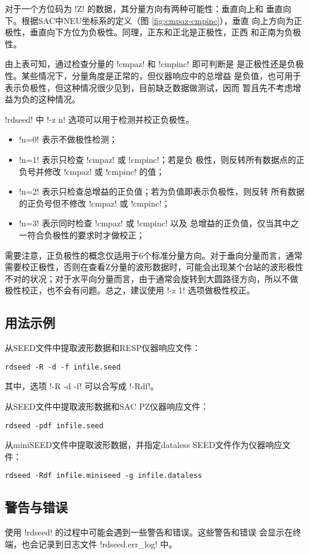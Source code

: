 对于一个方位码为 !Z! 的数据，其分量方向有两种可能性：垂直向上和
垂直向下。根据SAC中NEU坐标系的定义（图 \ref{fig:cmpaz-cmpinc}），垂直
向上方向为正极性，垂直向下方位为负极性。同理，正东和正北是正极性，正西
和正南为负极性。

由上表可知，通过检查分量的 !cmpaz! 和 !cmpinc! 即可判断是
是正极性还是负极性。某些情况下，分量角度是正常的，但仪器响应中的总增益
是负值，也可用于表示负极性，但这种情况很少见到，目前缺乏数据做测试，因而
暂且先不考虑增益为负的这种情况。

!rdseed! 中 !-z n! 选项可以用于检测并校正负极性。
\begin{itemize}
\item !n=0! 表示不做极性检测；
\item !n=1! 表示只检查 !cmpaz! 或 !cmpinc!；若是负
    极性，则反转所有数据点的正负号并修改 !cmpaz! 或 !cmpinc!
    的值；
\item !n=2! 表示只检查总增益的正负值；若为负值即表示负极性，则反转
    所有数据的正负号但不修改 !cmpaz! 或 !cmpinc!；
\item !n=3! 表示同时检查 !cmpaz! 或 !cmpinc! 以及
    总增益的正负值，仅当其中之一符合负极性的要求时才做校正；
\end{itemize}

需要注意，正负极性的概念仅适用于6个标准分量方向。对于垂向分量而言，通常
需要校正极性，否则在查看Z分量的波形数据时，可能会出现某个台站的波形极性
不对的状况；对于水平向分量而言，由于通常会旋转到大圆路径方向，所以不做
极性校正，也不会有问题。总之，建议使用 !-z 1! 选项做极性校正。

\subsection{用法示例}
从SEED文件中提取波形数据和RESP仪器响应文件：
\begin{verbatim}
rdseed -R -d -f infile.seed
\end{verbatim}
其中，选项 !-R -d -f! 可以合写成 !-Rdf!。

从SEED文件中提取波形数据和SAC PZ仪器响应文件：
\begin{verbatim}
rdseed -pdf infile.seed
\end{verbatim}

从miniSEED文件中提取波形数据，并指定dataless SEED文件作为仪器响应文件：
\begin{verbatim}
rdseed -Rdf infile.miniseed -g infile.dataless
\end{verbatim}

\subsection{警告与错误}
使用 !rdseed! 的过程中可能会遇到一些警告和错误。这些警告和错误
会显示在终端，也会记录到日志文件 !rdseed.err_log! 中。

